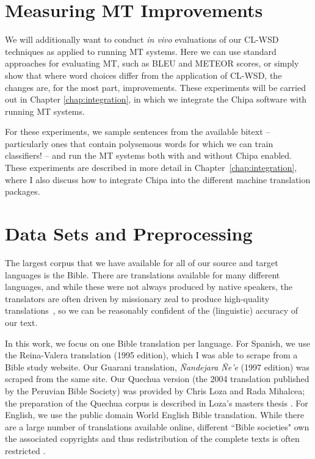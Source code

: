 
\section{Measuring MT Improvements}
We will additionally want to conduct \emph{in vivo} evaluations of our CL-WSD
techniques as applied to running MT systems. Here we can use standard
approaches for evaluating MT, such as BLEU and METEOR scores, or simply show
that where word choices differ from the application of CL-WSD, the changes are,
for the most part, improvements.
These experiments will be carried out in Chapter \ref{chap:integration}, in
which we integrate the Chipa software with running MT systems.

For these experiments, we sample sentences from the available bitext --
particularly ones that contain polysemous words for which we can train
classifiers! -- and run the MT systems both with and without Chipa enabled.
These experiments are described in more detail in
Chapter~\ref{chap:integration}, where I also discuss how to integrate Chipa
into the different machine translation packages.

\section{Data Sets and Preprocessing}
The largest corpus that we have available for all of our source and target
languages is the Bible. There are translations available for many different
languages, and while these were not always produced by native speakers, the
translators are often driven by missionary zeal to produce high-quality
translations~\cite{DBLP:journals/lre/ResnikOD99}, so we can be reasonably
confident of the (linguistic) accuracy of our text.

In this work, we focus on one Bible translation per language. For Spanish, we
use the Reina-Valera translation (1995 edition), which I was able to scrape
from a Bible study website. Our Guarani translation, \emph{Ñandejara Ñe'e}
(1997 edition) was scraped from the same site. Our Quechua version (the 2004
translation published by the Peruvian Bible Society) was provided by Chris Loza
and Rada Mihalcea; the preparation of the Quechua corpus is described in Loza's
masters thesis \cite{chrisloza}. For English, we use the public domain World
English Bible translation.
While there are a large number of translations available online, different
``Bible societies" own the associated copyrights and thus redistribution of the
complete texts is often restricted \cite{MAYER14.220.L14-1215}.

